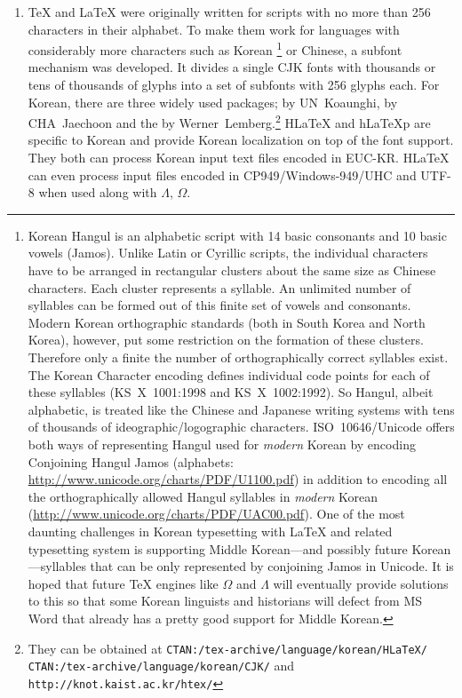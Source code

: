 \begin{enumerate}
\item \TeX{} and \LaTeX{} were originally written for
scripts with no more than 256 characters in their alphabet.
To make them work for languages with considerably 
more characters such as
Korean%
 \footnote{Korean Hangul is an alphabetic script with 14 basic consonants
 and 10 basic vowels (Jamos). Unlike Latin or Cyrillic scripts, the
 individual characters have to be arranged in rectangular
 clusters about the same size as Chinese characters. Each cluster
 represents a syllable. An unlimited number of syllables can be
 formed out of this finite set of vowels and consonants. Modern Korean
 orthographic standards (both in South Korea and  North Korea), however,
 put some restriction on the formation of these clusters.
 Therefore only a finite the number of  orthographically correct syllables exist.
 The Korean Character encoding defines individual code points for each of these syllables (KS~X~1001:1998 and KS~X~1002:1992). So Hangul, albeit alphabetic, is
 treated like the Chinese and Japanese writing systems with tens of thousands of
 ideographic/logographic characters.  ISO~10646/Unicode offers both ways of
 representing Hangul used for \emph{modern} Korean by encoding Conjoining
 Hangul Jamos (alphabets: \url{http://www.unicode.org/charts/PDF/U1100.pdf})
 in addition to encoding all the orthographically allowed Hangul syllables in
 \emph{modern} Korean (\url{http://www.unicode.org/charts/PDF/UAC00.pdf}).
 One of the most daunting challenges in Korean typesetting with
 \LaTeX{} and related typesetting system is supporting Middle Korean---and possibly future Korean---syllables that can be only represented
 by conjoining Jamos in Unicode. It is hoped that future \TeX{} engines like $\Omega$ and
 $\Lambda$ will eventually provide solutions to this
 so that some Korean linguists and historians
 will defect from MS Word that already has  a pretty good support 
 for Middle Korean.}
or Chinese, a subfont mechanism was developed.
It divides a single CJK fonts with  thousands or tens of thousands of
glyphs into a set of subfonts with 256 glyphs each. 
For Korean, there are three widely used packages;  
by UN~Koaunghi,  by CHA~Jaechoon and the 
by Werner~Lemberg.\footnote{%
They can be obtained at \texttt{CTAN:/tex-archive/language/korean/HLaTeX/}\\
   \texttt{CTAN:/tex-archive/language/korean/CJK/} and
   \texttt{http://knot.kaist.ac.kr/htex/}}
H\LaTeX{} and h\LaTeX{}p are specific to Korean and provide
Korean localization on top of the font support.
They both can process Korean input text files encoded in EUC-KR. H\LaTeX{} can
even process input files encoded in CP949/Windows-949/UHC and UTF-8
when used along with $\Lambda$, $\Omega$.


\end{enumerate}
